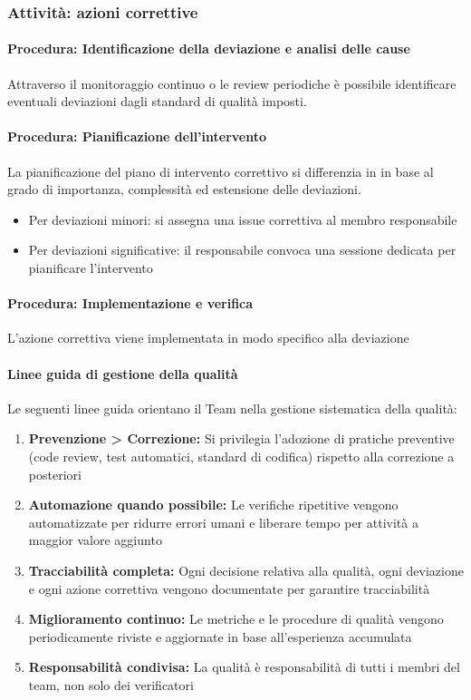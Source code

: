 \documentclass[a4paper,12pt]{article}
\begin{document}
\subsubsection{Attività: azioni correttive}\label{azioni_correttive}

\paragraph{Procedura: Identificazione della deviazione e analisi delle cause}
Attraverso il monitoraggio continuo o le review periodiche è possibile
identificare eventuali deviazioni dagli standard di qualità imposti.
\paragraph{Procedura: Pianificazione dell'intervento}
La pianificazione del piano di intervento correttivo si differenzia in in base
al grado di importanza, complessità ed estensione delle deviazioni.
\begin{itemize}
    \item Per deviazioni minori: si assegna una issue correttiva al membro responsabile
    \item Per deviazioni significative: il responsabile convoca una sessione dedicata per
          pianificare l'intervento
\end{itemize}
\paragraph{Procedura: Implementazione e verifica}
L'azione correttiva viene implementata in modo specifico alla deviazione

\paragraph{Linee guida di gestione della qualità}
Le seguenti linee guida orientano il Team nella gestione sistematica della
qualità:
\begin{enumerate}
    \item \textbf{Prevenzione > Correzione:} Si privilegia l'adozione di pratiche preventive (code review, test automatici, standard di codifica) rispetto alla correzione a posteriori
    \item \textbf{Automazione quando possibile:} Le verifiche ripetitive vengono automatizzate per ridurre errori umani e liberare tempo per attività a maggior valore aggiunto
    \item \textbf{Tracciabilità completa:} Ogni decisione relativa alla qualità, ogni deviazione e ogni azione correttiva vengono documentate per garantire tracciabilità
    \item \textbf{Miglioramento continuo:} Le metriche e le procedure di qualità vengono periodicamente riviste e aggiornate in base all'esperienza accumulata
    \item \textbf{Responsabilità condivisa:} La qualità è responsabilità di tutti i membri del team, non solo dei verificatori
\end{enumerate}
\end{document}
